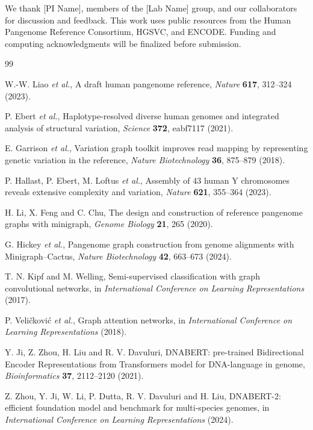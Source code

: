 \IfFileExists{ws-procs11x85.cls}{\worldscientificclasstrue\documentclass{ws-procs11x85}}{\worldscientificclassfalse\documentclass[11pt]{article}\usepackage[margin=1in]{geometry}}
\begin{document}
We thank [PI Name], members of the [Lab Name] group, and our collaborators for
discussion and feedback. This work uses public resources from the Human Pangenome
Reference Consortium, HGSVC, and ENCODE. Funding and computing acknowledgments
will be finalized before submission.

\begin{thebibliography}{99}

W.-W. Liao \textit{et al.}, A draft human pangenome reference,
\textit{Nature} \textbf{617}, 312--324 (2023).

P. Ebert \textit{et al.}, Haplotype-resolved diverse human genomes and
integrated analysis of structural variation, \textit{Science} \textbf{372},
eabf7117 (2021).

E. Garrison \textit{et al.}, Variation graph toolkit improves read mapping by
representing genetic variation in the reference, \textit{Nature Biotechnology}
\textbf{36}, 875--879 (2018).

P. Hallast, P. Ebert, M. Loftus \textit{et al.}, Assembly of 43 human Y
chromosomes reveals extensive complexity and variation, \textit{Nature}
\textbf{621}, 355--364 (2023).

H. Li, X. Feng and C. Chu, The design and construction of reference pangenome
graphs with minigraph, \textit{Genome Biology} \textbf{21}, 265 (2020).

G. Hickey \textit{et al.}, Pangenome graph construction from genome alignments
with Minigraph--Cactus, \textit{Nature Biotechnology} \textbf{42}, 663--673
(2024).

T. N. Kipf and M. Welling, Semi-supervised classification with graph
convolutional networks, in \textit{International Conference on Learning
Representations} (2017).

P. Veli\v{c}kovi\'c \textit{et al.}, Graph attention networks, in
\textit{International Conference on Learning Representations} (2018).

Y. Ji, Z. Zhou, H. Liu and R. V. Davuluri, DNABERT: pre-trained Bidirectional
Encoder Representations from Transformers model for DNA-language in genome,
\textit{Bioinformatics} \textbf{37}, 2112--2120 (2021).

Z. Zhou, Y. Ji, W. Li, P. Dutta, R. V. Davuluri and H. Liu, DNABERT-2:
efficient foundation model and benchmark for multi-species genomes, in
\textit{International Conference on Learning Representations} (2024).


\end{thebibliography}
\end{document}
